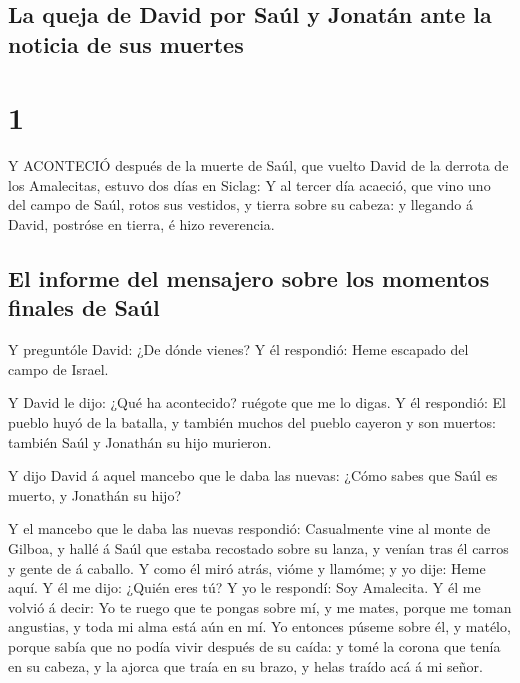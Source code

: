 \hypertarget{la-queja-de-david-por-sauxfal-y-jonatuxe1n-ante-la-noticia-de-sus-muertes}{%
\subsection{La queja de David por Saúl y Jonatán ante la noticia de sus
muertes}\label{la-queja-de-david-por-sauxfal-y-jonatuxe1n-ante-la-noticia-de-sus-muertes}}

\hypertarget{section}{%
\section{1}\label{section}}

 Y ACONTECIÓ después de la muerte de Saúl, que vuelto David
de la derrota de los Amalecitas, estuvo dos días en Siclag: 
Y al tercer día acaeció, que vino uno del campo de Saúl, rotos sus
vestidos, y tierra sobre su cabeza: y llegando á David, postróse en
tierra, é hizo reverencia.

\hypertarget{el-informe-del-mensajero-sobre-los-momentos-finales-de-sauxfal}{%
\subsection{El informe del mensajero sobre los momentos finales de
Saúl}\label{el-informe-del-mensajero-sobre-los-momentos-finales-de-sauxfal}}

 Y preguntóle David: ¿De dónde vienes? Y él respondió: Heme
escapado del campo de Israel.

 Y David le dijo: ¿Qué ha acontecido? ruégote que me lo
digas. Y él respondió: El pueblo huyó de la batalla, y también muchos
del pueblo cayeron y son muertos: también Saúl y Jonathán su hijo
murieron.

 Y dijo David á aquel mancebo que le daba las nuevas: ¿Cómo
sabes que Saúl es muerto, y Jonathán su hijo?

 Y el mancebo que le daba las nuevas respondió: Casualmente
vine al monte de Gilboa, y hallé á Saúl que estaba recostado sobre su
lanza, y venían tras él carros y gente de á caballo.  Y como
él miró atrás, vióme y llamóme; y yo dije: Heme aquí.  Y él
me dijo: ¿Quién eres tú? Y yo le respondí: Soy Amalecita.  Y
él me volvió á decir: Yo te ruego que te pongas sobre mí, y me mates,
porque me toman angustias, y toda mi alma está aún en mí. 
Yo entonces púseme sobre él, y matélo, porque sabía que no podía vivir
después de su caída: y tomé la corona que tenía en su cabeza, y la
ajorca que traía en su brazo, y helas traído acá á mi señor.


